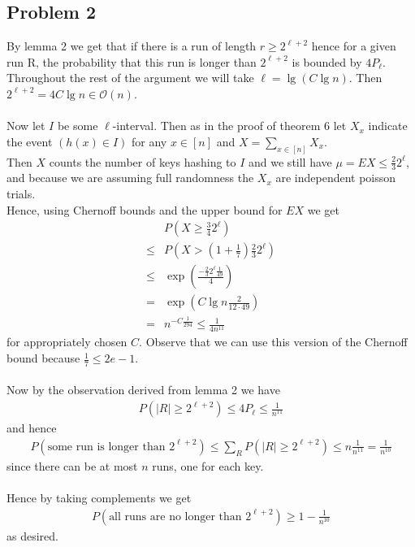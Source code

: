 \subsection*{Problem 2}
By lemma 2 we get that if there is a run of length $r \geq 2^{\ell+2}$ 
hence for a given run R, the probability that this run is longer than $2^{\ell+2}$ is bounded by $4 P_{\ell}$. \\ 
Throughout the rest of the argument we will take $\ell=\lg(C \lg n)$. 
Then $2^{\ell+2}=4C \lg n \in \mathcal{O}(n)$. \\ \\
Now let $I$ be some $\ell$-interval. Then as in the proof of theorem 6 let $X_x$ indicate the event
$\left( h(x) \in I \right)$ for any $x \in \left[ n \right]$ and $X=\sum_{x \in \left[ n \right]}^{}X_x$. \\
Then $X$ counts the number of keys hashing to $I$ and we still have $\mu=EX \leq \frac{2}{3}2^{\ell}$, 
and because we are assuming full randomness the $X_x$ are independent poisson trials. \\
Hence, using Chernoff bounds and the upper bound for $EX$ we get 
\begin{align*}
	&P(X \geq \frac{3}{4}2^{\ell}) \\
	\leq& P\left( X > (1+\frac{1}{7})\frac{2}{3}2^{\ell} \right) \\
	\leq & \exp \left( \frac{-\frac{2}{3}2^{\ell}\frac{1}{49}}{4} \right) \\
	=& \exp \left( C \lg n \frac{2}{12 \cdot 49} \right) \\
	=& n^{-C\frac{1}{294}} \leq \frac{1}{4n^{11}}
\end{align*}
for appropriately chosen $C$. 
Observe that we can use this version of the Chernoff bound because $\frac{1}{7} \leq 2e-1$. \\ \\
Now by the observation derived from lemma 2 we have
\begin{align*}
	P\left( |R| \geq 2^{\ell+2} \right) \leq 4 P_{\ell} \leq \frac{1}{n^{11}}
\end{align*}
and hence 
\begin{align*}
	P\left( \text{some run is longer than } 2^{\ell+2} \right) 
	\leq \sum_{R}^{}P\left( |R| \geq 2^{\ell+2} \right)
	\leq n \frac{1}{n^{11}}=\frac{1}{n^{10}}
\end{align*}
since there can be at most $n$ runs, one for each key. \\ \\
Hence by taking complements we get
\begin{align*}
	P\left( \text{all runs are no longer than } 2^{\ell+2} \right) \geq 1-\frac{1}{n^{10}}
\end{align*}
as desired.
